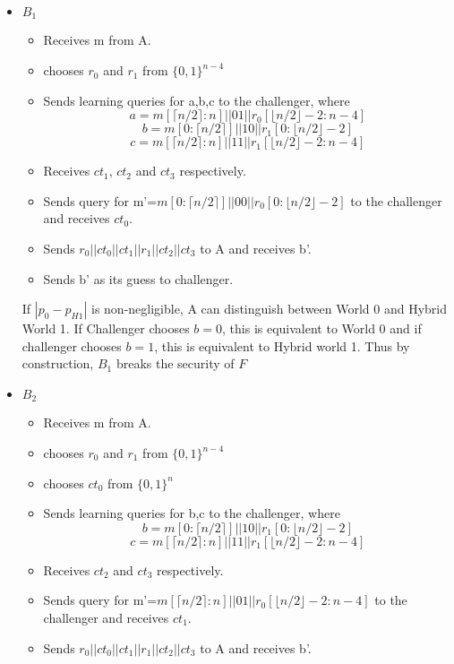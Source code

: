 \documentclass{article}
\begin{document}
\begin{itemize}
    \item $B_1$
    \begin{itemize}
        \item Receives m from A.
        \item chooses $r_0$ and $r_1$ from $\{0,1\}^{n-4}$
        \item Sends learning queries for a,b,c to the challenger, where
        \[a=m[\lceil n/2 \rceil:n ]\big|\big|01\big|\big|r_0[\lfloor n/2 \rfloor -2:n-4]\]
        \[b=m[0:\lceil n/2 \rceil ]\big|\big|10\big|\big|r_1[0:\lfloor n/2 \rfloor -2]\]
        \[c=m[\lceil n/2 \rceil:n ]\big|\big|11\big|\big|r_1[\lfloor n/2 \rfloor -2:n-4]\]
        \item Receives $ct_1$, $ct_2$ and $ct_3$ respectively.
        \item Sends query for m'=$m[0:\lceil n/2 \rceil ]\big|\big|00\big|\big|r_0[0:\lfloor n/2 \rfloor -2]$ to the challenger and receives $ct_0$.
        \item Sends $r_0||ct_0||ct_1||r_1||ct_2||ct_3$ to A and receives b'.
        \item Sends b' as its guess to challenger.
    \end{itemize}
    If $|p_0-p_{H1}|$ is non-negligible, A can distinguish between World 0 and Hybrid World 1. If Challenger chooses $b=0$, this is equivalent to World 0 and if challenger chooses $b=1$, this is equivalent to Hybrid world 1. Thus by construction, $B_1$ breaks the security of $F$
    \item $B_2$
    \begin{itemize}
        \item Receives m from A.
        \item chooses $r_0$ and $r_1$ from $\{0,1\}^{n-4}$
        \item chooses $ct_0$ from $\{0,1\}^n$
        \item Sends learning queries for b,c to the challenger, where
        \[b=m[0:\lceil n/2 \rceil ]\big|\big|10\big|\big|r_1[0:\lfloor n/2 \rfloor -2]\]
        \[c=m[\lceil n/2 \rceil:n ]\big|\big|11\big|\big|r_1[\lfloor n/2 \rfloor -2:n-4]\]
        \item Receives $ct_2$ and $ct_3$ respectively.
        \item Sends query for m'=$m[\lceil n/2 \rceil:n ]\big|\big|01\big|\big|r_0[\lfloor n/2 \rfloor -2:n-4]$ to the challenger and receives $ct_1$.
        \item Sends $r_0||ct_0||ct_1||r_1||ct_2||ct_3$ to A and receives b'.

\end{itemize}
\end{itemize}
\end{document}
